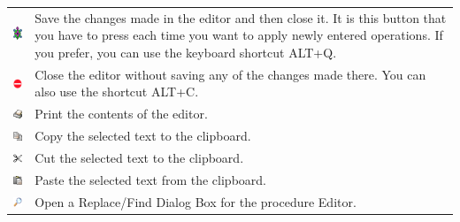 \begin{longtable}{cm{12cm}}
 \includegraphics*[scale=1]{pics/interface-turtle.png} &
Save the changes made in the editor and then close it. It is this
button that you have to press each time you want to apply newly entered
operations. If you prefer, you can use the keyboard shortcut ALT+Q.\\
\includegraphics*[scale=1]{pics/interface-quit.png}&
Close the editor without saving any of the changes made there. You
can also use the shortcut ALT+C.\\
 \includegraphics*[scale=1]{pics/interface-fileprint.png}&
 Print the contents of the editor.\\
 \includegraphics*[scale=1]{pics/interface-editcopy.png}&
 Copy the selected text to the clipboard.\\
 \includegraphics*[scale=1]{pics/interface-editcut.png}&
 Cut the selected text to the clipboard.\\
 \includegraphics*[scale=1]{pics/interface-editpaste.png}&
 Paste the selected text from the clipboard.\\
 \includegraphics*[scale=1]{pics/interface-chercher.png}&
 Open a Replace/Find Dialog Box for the procedure Editor.\\
\end{longtable}
